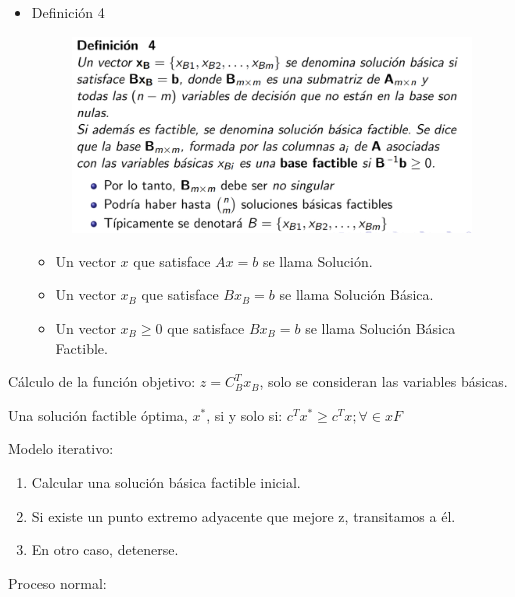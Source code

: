 \documentclass[12pt, twoside, openright]{report} %
\begin{document}
    \begin{itemize}
    \item
      Definición 4
	  \begin{figure}[H]
		{\includegraphics[scale=.3]{Untitled 10.png}}
	\end{figure}
	  \begin{itemize}
		  \item Un vector \(x\) que satisface \(Ax=b\) se llama Solución.
		  \item Un vector \(x_B\) que satisface \(Bx_B=b\) se llama Solución Básica.
		  \item Un vector \(x_B \geq 0\) que satisface \(Bx_B=b\) se llama Solución Básica Factible.
	  \end{itemize}
    \end{itemize}

	
    Cálculo de la función objetivo: \(z=C_B^Tx_B\), solo se consideran
    las variables básicas.

	Una solución factible óptima, \(x^*\), si y solo si:
    \(c^Tx^* \geq c^Tx; \forall \in xF\)

	Modelo iterativo:

    \begin{enumerate}
    \def\labelenumi{\arabic{enumi}.}
  
    \item
      Calcular una solución básica factible inicial.
    \item
      Si existe un punto extremo adyacente que mejore z, transitamos a
      él.
    \item
      En otro caso, detenerse.
    \end{enumerate}
\pagebreak
	Proceso normal:
\end{document}

